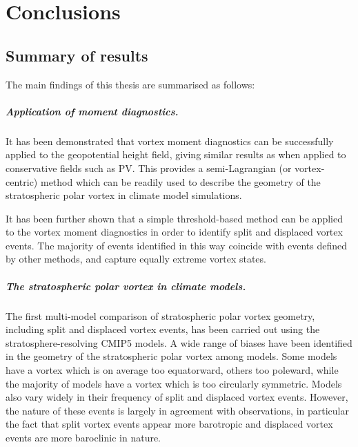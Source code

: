 \chapter{Conclusions}
\label{cha:conclusions}

\section{Summary of results}

The main findings of this thesis are summarised as follows:

\paragraph{Application of moment diagnostics.} It has been demonstrated that
vortex moment diagnostics can be successfully applied to the geopotential height
field, giving similar results as when applied to conservative fields such as
PV. This provides a semi-Lagrangian (or vortex-centric) method which can be
readily used to describe the geometry of the stratospheric polar vortex in
climate model simulations.

It has been further shown that a simple threshold-based method can be applied to
the vortex moment diagnostics in order to identify split and displaced vortex
events. The majority of events identified in this way coincide with events
defined by other methods, and capture equally extreme vortex states.

\paragraph{The stratospheric polar vortex in climate models.} The first
multi-model comparison of stratospheric polar vortex geometry, including split
and displaced vortex events, has been carried out using the
stratosphere-resolving CMIP5 models. A wide range of biases have been identified
in the geometry of the stratospheric polar vortex among models. Some models have
a vortex which is on average too equatorward, others too poleward, while the
majority of models have a vortex which is too circularly symmetric. Models also
vary widely in their frequency of split and displaced vortex events. However,
the nature of these events is largely in agreement with observations, in
particular the fact that split vortex events appear more barotropic and
displaced vortex events are more baroclinic in nature.

